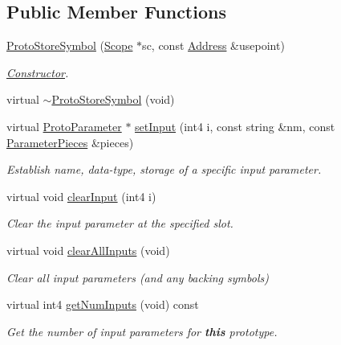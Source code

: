 \subsection*{Public Member Functions}
\begin{DoxyCompactItemize}
\item 
\mbox{\hyperlink{class_proto_store_symbol_ac124539bc8682646d3cd44dcb84ee960}{Proto\+Store\+Symbol}} (\mbox{\hyperlink{class_scope}{Scope}} $\ast$sc, const \mbox{\hyperlink{class_address}{Address}} \&usepoint)
\begin{DoxyCompactList}\small\item\em \mbox{\hyperlink{class_constructor}{Constructor}}. \end{DoxyCompactList}\item 
virtual \mbox{\hyperlink{class_proto_store_symbol_aa9b1e5730ea26546b4cb1ef587e16daf}{$\sim$\+Proto\+Store\+Symbol}} (void)
\item 
virtual \mbox{\hyperlink{class_proto_parameter}{Proto\+Parameter}} $\ast$ \mbox{\hyperlink{class_proto_store_symbol_af9e24d39271ea90fc074010e4b24a2b1}{set\+Input}} (int4 i, const string \&nm, const \mbox{\hyperlink{struct_parameter_pieces}{Parameter\+Pieces}} \&pieces)
\begin{DoxyCompactList}\small\item\em Establish name, data-\/type, storage of a specific input parameter. \end{DoxyCompactList}\item 
virtual void \mbox{\hyperlink{class_proto_store_symbol_aa36f84c14205c90e18708858a3ae4ae5}{clear\+Input}} (int4 i)
\begin{DoxyCompactList}\small\item\em Clear the input parameter at the specified slot. \end{DoxyCompactList}\item 
virtual void \mbox{\hyperlink{class_proto_store_symbol_a4542dcfd95d5a0e225c327e40208ea71}{clear\+All\+Inputs}} (void)
\begin{DoxyCompactList}\small\item\em Clear all input parameters (and any backing symbols) \end{DoxyCompactList}\item 
virtual int4 \mbox{\hyperlink{class_proto_store_symbol_a26d8910259e3965c4491048935c277ec}{get\+Num\+Inputs}} (void) const
\begin{DoxyCompactList}\small\item\em Get the number of input parameters for {\bfseries{this}} prototype. \end{DoxyCompactList}\item 

\end{DoxyCompactItemize}
